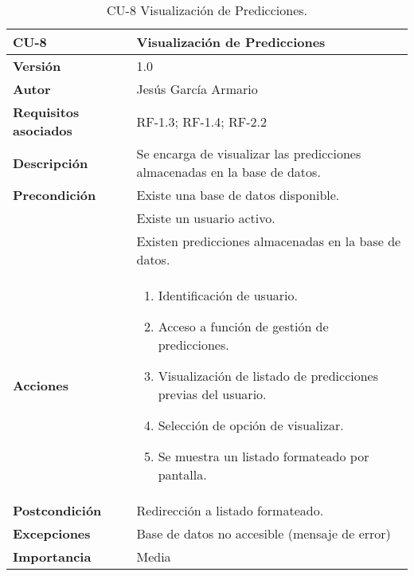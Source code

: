 \begin{table}[p]
	\centering
	\begin{tabularx}{\linewidth}{ p{} p{} }
		\toprule
		\textbf{CU-8}    & \textbf{Visualización de Predicciones}\\
		\toprule
		\textbf{Versión}              & 1.0    \\
		\textbf{Autor}                & Jesús García Armario \\
		\textbf{Requisitos asociados} & RF-1.3; RF-1.4; RF-2.2 \\
		\textbf{Descripción}          & Se encarga de visualizar las predicciones almacenadas en la base de datos. \\
		\textbf{Precondición}         & Existe una base de datos disponible. \\
  & Existe un usuario activo.\\
  & Existen predicciones almacenadas en la base de datos.\\
		\textbf{Acciones}             &
		\begin{enumerate}
			\def\labelenumi{\arabic{enumi}.}
			\tightlist
			\item Identificación de usuario.
   \item Acceso a función de gestión de predicciones.
   \item Visualización de listado de predicciones previas del usuario.
   \item Selección de opción de visualizar.
   \item Se muestra un listado formateado por pantalla.
\end{enumerate}\\
		\textbf{Postcondición}        &  Redirección a listado formateado.\\
		\textbf{Excepciones}          & Base de datos no accesible (mensaje de error)\\
		\textbf{Importancia}          & Media \\
		\bottomrule
	\end{tabularx}
	\caption{CU-8 Visualización de Predicciones.}
 \end{table}

